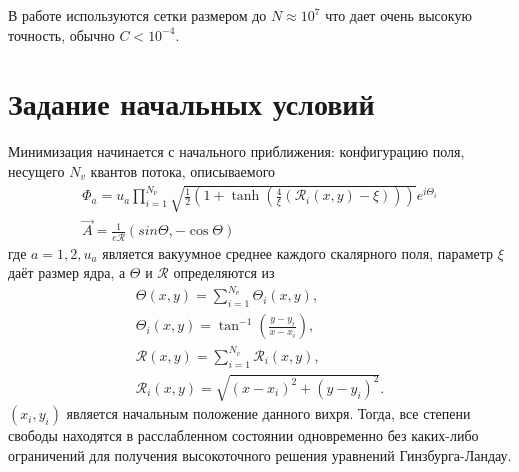 В работе используются сетки размером до \( N \approx 10^7 \) что дает очень 
высокую точность, обычно \( C < 10^{-4} \). \cite{bib:minimization}

\section{Задание начальных условий}

Минимизация начинается с начального приближения: конфигурацию поля, несущего
\( N_v \) квантов потока, описываемого
\begin{gather}
    \Phi_a = u_a \prod\limits_{i=1}^{N_\nu} \sqrt{ 
        \frac{1}{2}\left( 1 + \tanh\left( 
            \frac{4}{\xi}\left( \mathcal{R}_i(x,y) - \xi \right)
        \right) \right)
    } e^{i\Theta_i}
    \nonumber \\
    \vec{A} = \frac{1}{e\mathcal{R}}\left( sin\Theta, -\cos\Theta \right)
    \label{eqm:6}
\end{gather}
где \( a = 1,2, u_a \) является вакуумное среднее каждого скалярного поля, 
параметр \( \xi \) даёт размер ядра, а \( \Theta \) и
\( \mathcal{R} \) определяются из
\begin{gather}
    \Theta(x,y) = \sum\limits_{i=1}^{N_v} \Theta_i(x,y), \nonumber \\
    \Theta_i(x,y) = \tan^{-1}\left(\frac{y-y_i}{x-x_i} \right), \nonumber \\
    \mathcal{R}(x,y) = \sum\limits_{i=1}^{N_v} \mathcal{R}_i(x,y), \nonumber \\
    \mathcal{R}_i(x,y) = \sqrt{(x-x_i)^2+(y-y_i)^2}.
\end{gather}
\( (x_i,y_i) \) является начальным положение данного вихря. Тогда, все степени 
свободы находятся в расслабленном состоянии одновременно без каких-либо 
ограничений для получения высокоточного решения уравнений Гинзбурга-Ландау.
\cite{bib:minimization}

\newpage